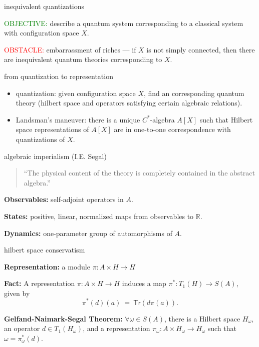 \documentclass{beamer}
\begin{document}
\begin{frame}{inequivalent quantizations}

  \textcolor{green}{OBJECTIVE:} describe a quantum system
  corresponding to a classical system with configuration space $X$.
  

  \bigskip

  \textcolor{red}{OBSTACLE:} embarrassment of riches --- if $X$ is not
  simply connected, then there are inequivalent quantum theories
  corresponding to $X$.

\end{frame}

\begin{frame}{from quantization to representation}

\begin{itemize}
\item quantization: given configuration space $X$, find an
  corresponding quantum theory (hilbert space and operators satisfying
  certain algebraic relations).
\item Landsman's maneuver: there is a unique $C^*$-algebra $A[X]$ such
  that Hilbert space representations of $A[X]$ are in one-to-one
  correspondence with quantizations of $X$.
\end{itemize}

\end{frame}


\begin{frame}{algebraic imperialism (I.E. Segal)}

  \begin{quote} ``The physical content of the theory is completely
    contained in the abstract algebra.'' \end{quote}

  \bigskip \textbf{Observables:} self-adjoint operators in $A$.

\bigskip \textbf{States:} positive, linear, normalized maps from
observables to $\mathbb{R}$.


\bigskip \textbf{Dynamics:} one-parameter group of automorphisms of
$A$.




\end{frame}

\begin{frame}{hilbert space conservatism} 


  \textbf{Representation:} a module $\pi :A\times H\to H$

  \bigskip \textbf{Fact:} A representation $\pi :A\times H\to H$
  induces a map $\pi ^*:T_1(H)\to S(A)$, given by
$$ \pi ^*(d)(a) \: = \: \mathsf{Tr}(d\pi (a)) .$$


\bigskip \textbf{Gelfand-Naimark-Segal Theorem:} $\forall \omega \in
S(A)$, there is a Hilbert space $H_\omega$, an operator $d\in
T_1(H_\omega )$, and a representation $\pi _\omega :A\times
H_\omega\to H_\omega$ such that $\omega =\pi _\omega ^*(d)$.

\end{frame}
\end{document}
